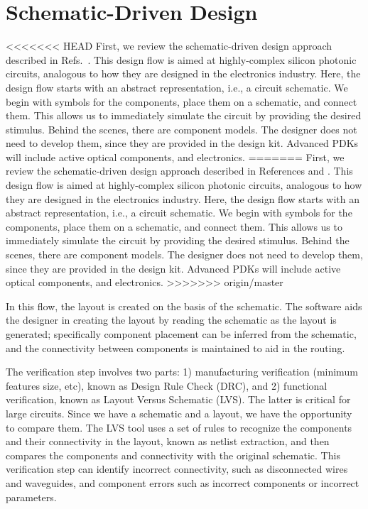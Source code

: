 \documentclass[journal]{spie}
\begin{document}
\section{Schematic-Driven Design}

<<<<<<< HEAD
First, we review the schematic-driven design approach described in Refs.~.   This design flow is aimed at highly-complex silicon photonic circuits, analogous to how they are designed in the electronics industry.  Here, the design flow starts with an abstract representation, i.e., a circuit schematic.  We begin with symbols for the components,  place them on a schematic, and connect them.   This allows us to immediately simulate the circuit by providing the desired stimulus.  Behind the scenes, there are component models.  The designer does not need to develop them, since they are provided in the design kit.  Advanced PDKs will include active optical components, and electronics.  
=======
First, we review the schematic-driven design approach described in References  and .   This design flow is aimed at highly-complex silicon photonic circuits, analogous to how they are designed in the electronics industry.  Here, the design flow starts with an abstract representation, i.e., a circuit schematic.  We begin with symbols for the components,  place them on a schematic, and connect them.   This allows us to immediately simulate the circuit by providing the desired stimulus.  Behind the scenes, there are component models.  The designer does not need to develop them, since they are provided in the design kit.  Advanced PDKs will include active optical components, and electronics.  
>>>>>>> origin/master

In this flow, the layout is created on the basis of the schematic.  The software aids the designer in creating the layout by reading the schematic as the layout is generated; specifically component placement can be inferred from the schematic, and the connectivity between components is maintained to aid in the routing.

The verification step involves two parts: 1) manufacturing verification (minimum features size, etc), known as Design Rule Check (DRC), and 2) functional verification, known as Layout Versus Schematic  (LVS).  The latter is critical for large circuits.  Since we have a schematic and a layout, we have the opportunity to compare them.  The LVS tool uses a set of rules to recognize the components and their connectivity in the layout, known as netlist extraction, and then compares the components and connectivity with the original schematic.  This verification step can identify incorrect connectivity, such as disconnected wires and waveguides, and component errors such as incorrect components or incorrect parameters.
\end{document}
